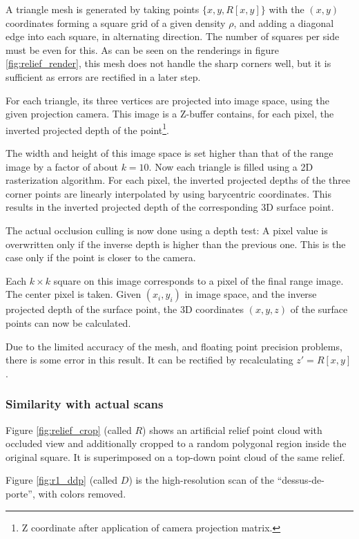 A triangle mesh is generated by taking points $\{ x, y, R[x,y] \}$ with the $(x,y)$ coordinates forming a square grid of a given density $\rho$, and adding a diagonal edge into each square, in alternating direction. The number of squares per side must be even for this. As can be seen on the renderings in figure \ref{fig:relief_render}, this mesh does not handle the sharp corners well, but it is sufficient as errors are rectified in a later step.

For each triangle, its three vertices are projected into image space, using the given projection camera. This image is a Z-buffer contains, for each pixel, the inverted projected depth of the point\footnote{Z coordinate after application of camera projection matrix.}.

The width and height of this image space is set higher than that of the range image by a factor of about $k = 10$. Now each triangle is filled using a 2D rasterization algorithm. For each pixel, the inverted projected depths of the three corner points are linearly interpolated by using barycentric coordinates. This results in the inverted projected depth of the corresponding 3D surface point.

The actual occlusion culling is now done using a depth test: A pixel value is overwritten only if the inverse depth is higher than the previous one. This is the case only if the point is closer to the camera.

Each $k \times k$ square on this image corresponds to a pixel of the final range image. The center pixel is taken. Given $(x_i, y_i)$ in image space, and the inverse projected depth of the surface point, the 3D coordinates $(x, y, z)$ of the surface points can now be calculated.

Due to the limited accuracy of the mesh, and floating point precision problems, there is some error in this result. It can be rectified by recalculating $z' = R[x, y]$.

\subsubsection{Similarity with actual scans}
Figure \ref{fig:relief_crop} (called $R$) shows an artificial relief point cloud with occluded view and additionally cropped to a random polygonal region inside the original square. It is superimposed on a top-down point cloud of the same relief.

Figure \ref{fig:r1_ddp} (called $D$) is the high-resolution scan of the ``dessus-de-porte'', with colors removed.

